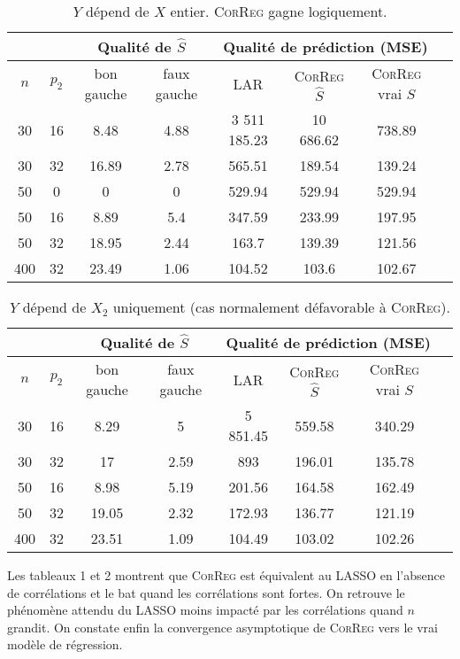 \documentclass[12pt]{article}
\begin{document}
\begin{table}
\centering
\begin{tabular}{|c|c|c|c|c|c|c|c|}
\cline{3-7}
 \multicolumn{2}{c|}{}  & \multicolumn{2}{c|}{Qualité de $\hat S$} & \multicolumn{3}{c|}{Qualité de prédiction (MSE)} \\
\hline 
$n$ & $p_2$ & bon gauche & faux gauche    & LAR  &    \textsc{CorReg} $\hat S$& \textsc{CorReg} vrai $S$\\ 
\hline 
30 & 16 & 8.48 & 4.88 & 3 511 185.23 & 10 686.62 & 738.89 \\ 
\hline 
30 & 32 & 16.89 & 2.78 & 565.51 & 189.54 & 139.24\\ 
\hline 
\hline 
50 & 0 & 0 & 0 & 529.94 & 529.94 & 529.94 \\ 
\hline 
50 & 16 & 8.89 & 5.4 & 347.59 & 233.99 & 197.95\\ 
\hline 
50 & 32 & 18.95 & 2.44 & 163.7 & 139.39 & 121.56 \\ 
\hline \hline
400 & 32 & 23.49 & 1.06 & 104.52 & 103.6 & 102.67\\ 
\hline 
\end{tabular} 
\caption{$Y$  dépend  de $X$ entier. \textsc{CorReg} gagne logiquement.} \label{tableMSEsimtout}
\end{table}


\begin{table}
\begin{tabular}{|c|c|c|c|c|c|c|c|}
\cline{3-7}
 \multicolumn{2}{c|}{}  & \multicolumn{2}{c|}{Qualité de $\hat S$} & \multicolumn{3}{c|}{Qualité de prédiction (MSE)} \\
\hline 
$n$ & $p_2$ & bon gauche & faux gauche    & LAR  &    \textsc{CorReg} $\hat S$ & \textsc{CorReg} vrai $S$\\ 
\hline 
30 & 16 & 8.29 & 5 & 5 851.45 & 559.58 & 340.29\\ 
\hline 
30 & 32 & 17 & 2.59 & 893 & 196.01 & 135.78 \\ 
\hline 
\hline 
50 & 16 &  8.98 & 5.19 & 201.56 & 164.58 & 162.49\\ 
\hline 
50 & 32 & 19.05 & 2.32 & 172.93 & 136.77 & 121.19\\ 
\hline \hline
400 & 32 & 23.51 & 1.09 & 104.49 & 103.02 & 102.26 \\ 
\hline 
\end{tabular} 
\caption{$Y$  dépend  de $X_2$ uniquement (cas normalement défavorable à \textsc{CorReg}). } \label{tableMSEsimgauche}
\end{table}


Les tableaux 1 et 2 montrent que \textsc{CorReg} est équivalent au LASSO en l'absence de corrélations et le bat quand les corrélations sont fortes. On retrouve le phénomène attendu du LASSO moins impacté par les corrélations quand $n$ grandit. On constate enfin la convergence asymptotique de \textsc{CorReg} vers le vrai modèle de régression.%
\end{document}
